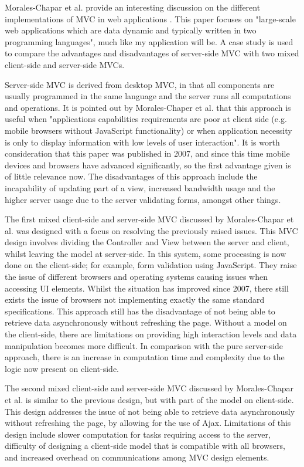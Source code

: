 \documentclass[authoryearcitations]{UoYCSproject}
\begin{document}
Morales-Chapar et al. provide an interesting discussion on the different implementations of MVC in web applications \citep{Morales-Chaparro2007}. This paper focuses on "large-scale web applications which are data dynamic and typically written in two programming languages", much like my application will be. A case study is used to compare the advantages and disadvantages of server-side MVC with two mixed client-side and server-side MVCs. 

Server-side MVC is derived from desktop MVC, in that all components are usually programmed in the same language and the server runs all computations and operations. It is pointed out by Morales-Chaper et al. that this approach is useful when "applications capabilities requirements are poor at client side (e.g. mobile browsers without JavaScript functionality) or when application necessity is only to display information with low levels of user interaction". It is worth consideration that this paper was published in 2007, and since this time mobile devices and browsers have advanced significantly, so the first advantage given is of little relevance now. The disadvantages of this approach include the incapability of updating part of a view, increased bandwidth usage and the higher server usage due to the server validating forms, amongst other things.  

The first mixed client-side and server-side MVC discussed by Morales-Chapar et al. was designed with a focus on resolving the previously raised issues. This MVC design involves dividing the Controller and View between the server and client, whilst leaving the model at server-side. In this system, some processing is now done on the client-side; for example, form validation using JavaScript. They raise the issue of different browsers and operating systems causing issues when accessing UI elements. Whilst the situation has improved since 2007, there still exists the issue of browsers not implementing exactly the same standard specifications. This approach still has the disadvantage of not being able to retrieve data asynchronously without refreshing the page. Without a model on the client-side, there are limitations on providing high interaction levels and data manipulation becomes more difficult. In comparison with the pure server-side approach, there is an increase in computation time and complexity due to the logic now present on client-side. 

The second mixed client-side and server-side MVC discussed by Morales-Chapar et al. is similar to the previous design, but with part of the model on client-side. This design addresses the issue of not being able to retrieve data asynchronously without refreshing the page, by allowing for the use of Ajax. Limitations of this design include slower computation for tasks requiring access to the server, difficulty of designing a client-side model that is compatible with all browsers, and increased overhead on communications among MVC design elements. 
\end{document}

